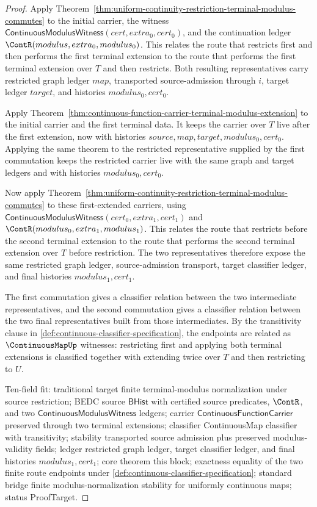 \begin{proof}
Apply Theorem~\ref{thm:uniform-continuity-restriction-terminal-modulus-commutes} to the initial carrier, the witness $\mathsf{ContinuousModulusWitness}(cert,extra_0,cert_0)$, and the continuation ledger $\ContR(modulus,extra_0,modulus_0)$. This relates the route that restricts first and then performs the first terminal extension to the route that performs the first terminal extension over $T$ and then restricts. Both resulting representatives carry restricted graph ledger $map$, transported source-admission through $i$, target ledger $target$, and histories $modulus_0,cert_0$.

Apply Theorem~\ref{thm:continuous-function-carrier-terminal-modulus-extension} to the initial carrier and the first terminal data. It keeps the carrier over $T$ live after the first extension, now with histories $source,map,target,modulus_0,cert_0$. Applying the same theorem to the restricted representative supplied by the first commutation keeps the restricted carrier live with the same graph and target ledgers and with histories $modulus_0,cert_0$.

Now apply Theorem~\ref{thm:uniform-continuity-restriction-terminal-modulus-commutes} to these first-extended carriers, using $\mathsf{ContinuousModulusWitness}(cert_0,extra_1,cert_1)$ and $\ContR(modulus_0,extra_1,modulus_1)$. This relates the route that restricts before the second terminal extension to the route that performs the second terminal extension over $T$ before restriction. The two representatives therefore expose the same restricted graph ledger, source-admission transport, target classifier ledger, and final histories $modulus_1,cert_1$.

The first commutation gives a classifier relation between the two intermediate representatives, and the second commutation gives a classifier relation between the two final representatives built from those intermediates. By the transitivity clause in \autoref{def:continuous-classifier-specification}, the endpoints are related as $\ContinuousMapUp$ witnesses: restricting first and applying both terminal extensions is classified together with extending twice over $T$ and then restricting to $U$.

Ten-field fit: traditional target finite terminal-modulus normalization under source restriction; BEDC source $\mathsf{BHist}$ with certified source predicates, $\ContR$, and two $\mathsf{ContinuousModulusWitness}$ ledgers; carrier $\mathsf{ContinuousFunctionCarrier}$ preserved through two terminal extensions; classifier ContinuousMap classifier with transitivity; stability transported source admission plus preserved modulus-validity fields; ledger restricted graph ledger, target classifier ledger, and final histories $modulus_1,cert_1$; core theorem this block; exactness equality of the two finite route endpoints under \autoref{def:continuous-classifier-specification}; standard bridge finite modulus-normalization stability for uniformly continuous maps; status ProofTarget.
\end{proof}

